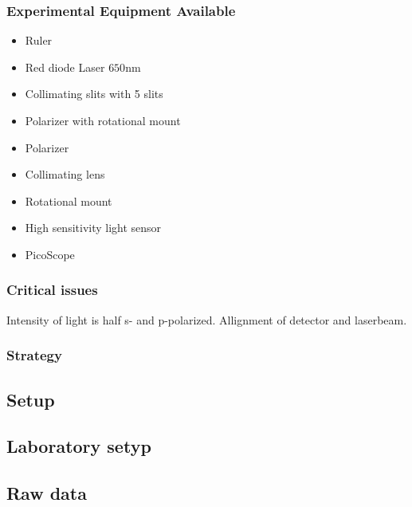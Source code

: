 \documentclass[a4paper, oneside, onecolumn, 11pt]{memoir}
\begin{document}
\subsubsection{Experimental Equipment Available}
\begin{itemize}
    \item Ruler
    \item Red diode Laser $650 \si{\nano\meter}$
    \item Collimating slits with 5 slits
    \item Polarizer with rotational mount
    \item Polarizer
    \item Collimating lens
    \item Rotational mount
    \item High sensitivity light sensor
    \item PicoScope
\end{itemize}

\subsubsection{Critical issues}
Intensity of light is half s- and p-polarized.
Allignment of detector and laserbeam.

\subsubsection{Strategy}

\subsection{Setup}

\subsection{Laboratory setyp}

\subsection{Raw data}
\end{document}
